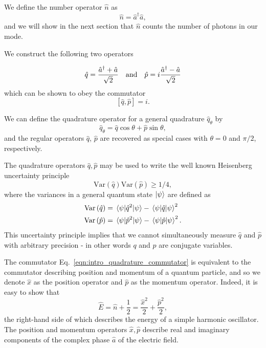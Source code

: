 We define the number operator $\hat{n}$ as 
\begin{equation}
\hat{n} = \hat{a}^\dagger \hat{a},
\end{equation}
and we will show in the next section that $\hat{n}$ counts the number of photons in our mode.

We construct the following two operators

\begin{equation}\label{eqn:intro_quadrature}
\hat{q} = \frac{\hat{a}^\dagger + \hat{a}}{\sqrt{2}} \qq{and} \hat{p} = i \frac{\hat{a}^\dagger - \hat{a}}{\sqrt{2}}
\end{equation}
which can be shown to obey the commutator
\begin{equation}\label{eqn:intro_quadrature_commutator}
\left[\hat{q}, \hat{p}\right] = i.
\end{equation}

\noindent We can define the quadrature operator for a general quadrature $\hat{q}_\theta$ by
\begin{equation}
\hat{q}_\theta = \hat{q} \cos\theta  + \hat{p} \sin\theta ,
\end{equation}
and the regular operators $\hat{q}$, $\hat{p}$ are recovered as special cases with $\theta = 0$ and $\pi/2$, respectively.


\noindent The quadrature operators $\hat{q}, \hat{p}$ may be used to write the well known Heisenberg uncertainty principle 
\begin{equation}
\text{Var}\left(\hat{q}\right)\text{Var}\left(\hat{p}\right) \ge 1/4, %
\end{equation} 
where the variances in a general quantum state $\ket{\psi}$ are defined as
\begin{align}
\text{Var}\left(\hat{q}\right) &= \mel{\psi}{\hat{q}^2}{\psi} - \mel{\psi}{\hat{q}}{\psi}^2 \notag \\
\text{Var}\left(\hat{p}\right) &= \mel{\psi}{\hat{p}^2}{\psi} - \mel{\psi}{\hat{p}}{\psi}^2.
\end{align}
This uncertainty principle implies that we cannot simultaneously measure $\hat{q}$ and $\hat{p}$ with arbitrary precision - in other words $q$ and $p$ are conjugate variables.


\noindent The commutator Eq.~\ref{eqn:intro_quadrature_commutator} is equivalent to the commutator describing position and momentum of a quantum particle, and so we denote $\hat{x}$ as the position operator and $\hat{p}$ as the momentum operator. Indeed, it is easy to show that
\begin{equation}
\hat{E} = \hat{n} + \frac{1}{2} = \frac{\hat{x}^2}{2} + \frac{\hat{p}^2}{2},
\end{equation}
the right-hand side of which describes the energy of a simple harmonic oscillator. The position and momentum operators $\hat{x}, \hat{p}$ describe real and imaginary components of the complex phase $\hat{a}$ of the electric field.



